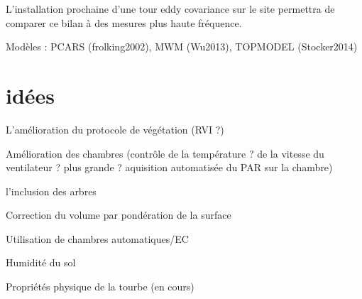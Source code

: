 L'installation prochaine d'une tour eddy covariance sur le site permettra de comparer ce bilan à des mesures plus haute fréquence.

Modèles : PCARS (frolking2002), MWM (Wu2013), TOPMODEL (Stocker2014)


\section*{idées}

L'amélioration du protocole de végétation (RVI ?)

Amélioration des chambres (contrôle de la température ? de la vitesse du ventilateur ? plus grande ? aquisition automatisée du PAR sur la chambre)

l'inclusion des arbres

Correction du volume par pondération de la surface

Utilisation de chambres automatiques/EC

Humidité du sol

Propriétés physique de la tourbe (en cours)

